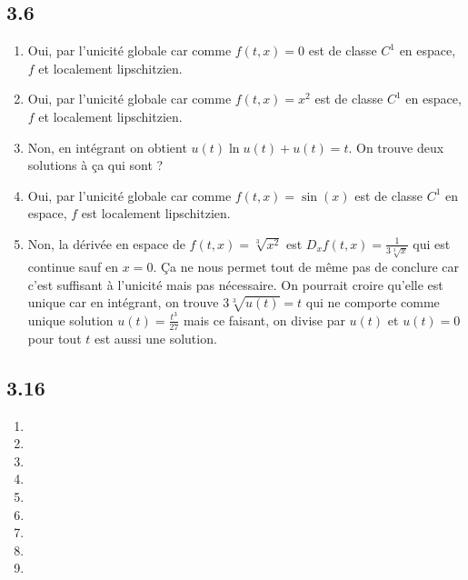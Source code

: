 \documentclass[fontsize=12pt]{article}
\begin{document}
\subsection*{3.6}
\begin{enumerate}
  \item Oui, par l'unicité globale car comme
    $f(t,x) = 0$ est de classe $C^1$ en espace,
    $f$ et localement lipschitzien.
  \item Oui, par l'unicité globale car comme
    $f(t,x) = x^2$ est de classe $C^1$ en espace,
    $f$ et localement lipschitzien.
  \item Non, en intégrant on obtient $u(t)\ln u(t) + u(t) = t$.
    On trouve deux solutions à ça qui sont ?
  \item Oui, par l'unicité globale car comme
    $f(t,x) = \sin(x)$ est de classe $C^1$ en espace,
    $f$ est localement lipschitzien.
  \item Non, la dérivée en espace de $f(t,x) = \sqrt[3]{x^2}$ est
    $D_x f(t,x) = \frac{1}{3\sqrt[3]{x}}$ qui est continue sauf en $x = 0$.
    Ça ne nous permet tout de même pas de conclure car c'est suffisant à
    l'unicité mais pas nécessaire.
    On pourrait croire qu'elle est unique car en intégrant, on trouve
    $3\sqrt[3]{u(t)} = t$ qui ne comporte comme unique solution
    $u(t) = \frac{t^3}{27}$ mais ce faisant, on divise par $u(t)$ et
    $u(t) = 0$ pour tout $t$ est aussi une solution.
\end{enumerate}

\subsection*{3.16}
\begin{enumerate}
  \item
  \item
  \item
  \item
  \item
  \item
  \item
  \item
  \item
\end{enumerate}
\end{document}
